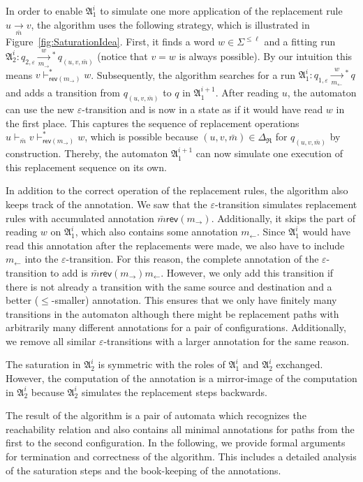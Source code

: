 \documentclass{LMCS}
\newcommand{\apathS}[2][]{\xrightarrow[#1]{#2}\!\!{}^*\,}
\newcommand{\eps}{\varepsilon}
\newcommand{\DeltaR}{\Delta_{\mathfrak R}}
\newcommand{\configstep}[1][]{\vdash_{#1}}
\newcommand{\automatonA}{\mathfrak A}
\newcommand{\configstepsCost}[2][*]{\vdash^{#1}_{#2}}
\newcommand{\pdsrule}[3]{#1 \xrightarrow[#2]{} #3}
\newcommand{\rl}{m_{\leftarrow}}
\newcommand{\rr}{m_{\rightarrow}}
\newcommand{\rev}{\mathsf{rev}}
\begin{document}
In order to enable $\automatonA^i_1$ to simulate one more application of the
replacement rule $\pdsrule{u}{\bar m}{v}$, the algorithm uses the following
strategy, which is illustrated in Figure~\ref{fig:SaturationIdea}. First, it
finds a word $w \in \Sigma^{\le \ell}$ and a fitting run $\automatonA^i_2: q_{2,\eps}
\apathS[\rr]{w} q_{(u,v,\bar m)}$ (notice that $v = w$ is always possible). By
our intuition this means $v \configstepsCost{\rev(\rr)} w$. Subsequently, the
algorithm searches for a run $\automatonA^i_1: q_{1,\eps} \apathS[\rl]{w} q$ and
adds a transition from $q_{(u,v,\bar m)}$ to $q$ in $\automatonA^{i+1}_1$. After reading $u$, the
automaton can use the new $\eps$-transition and is now in a state as if it would
have read $w$ in the first place. This captures the sequence of replacement
operations $u \configstep[\bar m] v \configstepsCost{\rev(\rr)} w$, which is 
possible because $(u,v,\bar m) \in \DeltaR$ for $q_{(u,v,\bar m)}$ by construction.
Thereby, the automaton $\automatonA^{i+1}_1$ can now simulate one execution of this replacement sequence on its own. 

In addition to the correct operation of the replacement rules, the algorithm
also keeps track of the annotation. We saw that the $\eps$-transition simulates
replacement rules with accumulated annotation $\bar m\rev(\rr)$. Additionally, it
skips the part of reading $w$ on $\automatonA^i_1$, which also contains some
annotation $\rl$. Since $\automatonA^i_1$ would have read this annotation after
the replacements were made,  we also have to include $\rl$ into the
$\eps$-transition. For this reason, the complete annotation of the
$\eps$-transition to add is $\bar m\rev(\rr)\rl$. However, we only add this
transition if there is not already a transition with the same source and
destination and a better ($\le$-smaller) annotation. This ensures that we only
have finitely many transitions in the automaton although there might be
replacement paths with arbitrarily many different annotations for a pair of
configurations. Additionally, we remove all similar $\eps$-transitions with a
larger annotation for the same reason. 

The saturation in $\automatonA^i_2$ is symmetric with the roles of
$\automatonA^i_1$ and $\automatonA^i_2$ exchanged. However, the computation of
the annotation is a mirror-image of the computation in $\automatonA^i_2$
because $\automatonA^i_2$ simulates the replacement steps backwards. 

The result of the algorithm is a pair of automata which recognizes the
reachability relation and also contains all minimal annotations for paths from
the first to the second configuration. In the following, we provide formal
arguments for termination and correctness of the algorithm. This includes a
detailed analysis of the saturation steps and the book-keeping of the
annotations.
\end{document}
